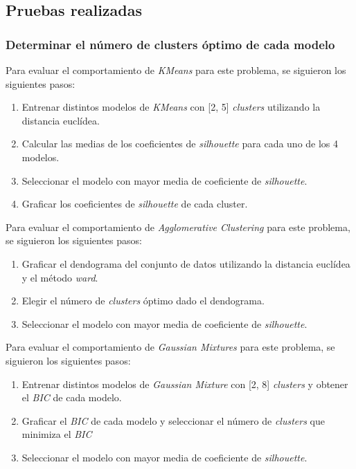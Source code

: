 \documentclass{article}
\begin{document}
\subsection{Pruebas realizadas}

\subsubsection{Determinar el número de clusters óptimo de cada modelo}
\label{sec:pasos-individuales}

\noindent Para evaluar el comportamiento de \textit{KMeans} para este problema, se siguieron los siguientes pasos:

\begin{enumerate}
  \item Entrenar distintos modelos de \textit{KMeans} con [2, 5] \textit{clusters} utilizando la distancia euclídea.
  \item Calcular las medias de los coeficientes de \textit{silhouette} para cada uno de los 4 modelos.
  \item Seleccionar el modelo con mayor media de coeficiente de \textit{silhouette}.
  \item Graficar los coeficientes de \textit{silhouette} de cada cluster.
\end{enumerate}

\noindent Para evaluar el comportamiento de \textit{Agglomerative Clustering} para este problema, se siguieron los siguientes pasos:

\begin{enumerate}
  \item Graficar el dendograma del conjunto de datos utilizando la distancia euclídea y el método \textit{ward}.
  \item Elegir el número de \textit{clusters} óptimo dado el dendograma.
  \item Seleccionar el modelo con mayor media de coeficiente de \textit{silhouette}.
\end{enumerate}

\noindent Para evaluar el comportamiento de \textit{Gaussian Mixtures} para este problema, se siguieron los siguientes pasos:

\begin{enumerate}
  \item Entrenar distintos modelos de \textit{Gaussian Mixture} con [2, 8] \textit{clusters} y obtener el \textit{BIC} de cada modelo.
  \item Graficar el \textit{BIC} de cada modelo y seleccionar el número de \textit{clusters} que minimiza el \textit{BIC}
  \item Seleccionar el modelo con mayor media de coeficiente de \textit{silhouette}.
\end{enumerate}
\end{document}
